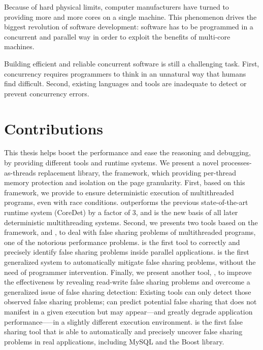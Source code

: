 \label{chapter:conclusion}

Because of hard physical limits, computer manufacturers have turned to providing more and more cores on a single machine. This phenomenon drives the biggest revolution of software development: software has to be programmed in a concurrent and parallel way in order to exploit the benefits of multi-core machines.

Building efficient and reliable concurrent software is still a challenging task. First, concurrency requires programmers to think in an unnatural way that humans find difficult.  Second, existing languages and tools are inadequate to detect or prevent concurrency errors.  

\section{Contributions}

This thesis helps boost the performance and ease the reasoning and debugging, by providing different tools and runtime systems. We present a novel processes-as-threads replacement library, the \sheriff{} framework, which providing per-thread memory protection and isolation on the page granularity. First, based on this framework, we provide \dthreads{} to ensure deterministic execution of multithreaded programs, even with race conditions. \dthreads{} outperforms the previous state-of-the-art runtime system (CoreDet) by a factor of 3, and is the new basis of all later deterministic multithreading systems. Second, we presents two tools based on the \Sheriff{} framework, \SheriffDetect{} and \SheriffProtect{}, to deal with false sharing problems of multithreaded programs, one of the notorious performance problems. \SheriffDetect{} is the first tool to correctly and precisely identify false sharing problems inside parallel applications. \SheriffProtect{} is the first generalized system to automatically mitigate false sharing problems, without the need of programmer intervention.  Finally, we present another tool, \predator{}, to improve the effectiveness by revealing read-write false sharing problems and overcome a generalized issue of false sharing detection: Existing tools can only detect those observed false sharing problems; \Predator{} can predict potential false sharing that does not manifest in a given execution but may appear---and greatly degrade application performance—--in a slightly different execution environment. \Predator{} is the first false sharing tool that is able to automatically and precisely uncover false sharing problems in real applications, including MySQL and the Boost library.

